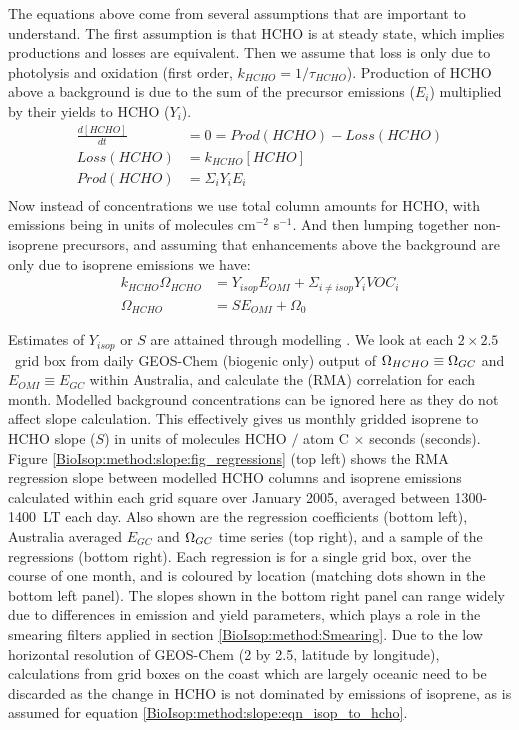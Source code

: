     The equations above come from several assumptions that are important to understand.
    The first assumption is that HCHO %
    is at steady state, which implies productions and losses are equivalent.
    Then we assume that loss is only due to photolysis and oxidation (first order, $k_{HCHO} = 1/\tau_{HCHO}$).
    Production of HCHO above a background is due to the sum of the precursor emissions ($E_i$) multiplied by their yields to HCHO ($Y_i$).
    \begin{eqnarray*}
      \frac{d [ HCHO ] }{dt} & = 0 = Prod(HCHO) - Loss(HCHO) \\
      Loss(HCHO)  & = k_{HCHO} [ HCHO ] \\
      Prod(HCHO)  & = \Sigma_i Y_i E_i  \\
    \end{eqnarray*}
    Now instead of concentrations we use total column amounts for HCHO, with emissions being in units of molecules cm$^{-2}$ s$^{-1}$.
    And then lumping together non-isoprene precursors, and assuming that enhancements above the background are only due to isoprene emissions we have: 
    \begin{eqnarray*}
    k_{HCHO} \Omega_{HCHO} & = Y_{isop} E_{OMI} + \Sigma_{i \ne isop} Y_{i} VOC_{i} \\
    \Omega_{HCHO} & = S E_{OMI} + \Omega_{0}
    \end{eqnarray*}
    
    
    Estimates of $Y_{isop}$ or $S$ are attained through modelling \parencite[e.g.][]{Millet2006}.
    We look at each $2\times2.5$~\degr grid box from daily GEOS-Chem (biogenic only) output of $\Omega_{HCHO} \equiv \Omega_{GC}$ and $E_{OMI} \equiv E_{GC}$ within Australia, and calculate the (RMA) correlation for each month.
    Modelled background concentrations can be ignored here as they do not affect slope calculation.
    This effectively gives us monthly gridded isoprene to HCHO slope ($S$) in units of molecules HCHO $/$ atom C $\times$ seconds (seconds).
    Figure \ref{BioIsop:method:slope:fig_regressions} (top left) shows the RMA regression slope between modelled HCHO columns and isoprene emissions calculated within each grid square over January 2005, averaged between 1300-1400~LT each day.
    Also shown are the regression coefficients (bottom left), Australia averaged $E_{GC}$ and $\Omega_{GC}$ time series (top right), and a sample of the regressions (bottom right).
    Each regression is for a single grid box, over the course of one month, and is coloured by location (matching dots shown in the bottom left panel).
    The slopes shown in the bottom right panel can range widely due to differences in emission and yield parameters, which plays a role in the smearing filters applied in section \ref{BioIsop:method:Smearing}.
    Due to the low horizontal resolution of GEOS-Chem (2 by 2.5\degr, latitude by longitude), calculations from grid boxes on the coast which are largely oceanic need to be discarded as the change in HCHO is not dominated by emissions of isoprene, as is assumed for equation \ref{BioIsop:method:slope:eqn_isop_to_hcho}.
    
